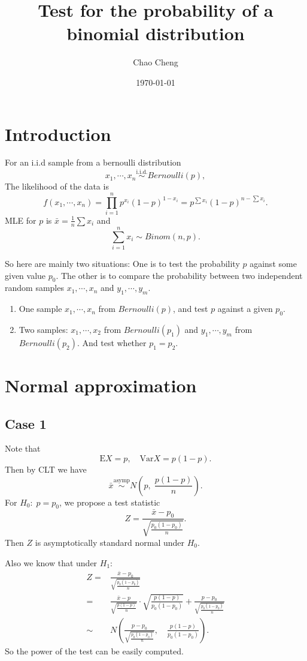 \documentclass[a4paper,12pt]{article}
\title{Test for the probability of a binomial distribution}
\author{Chao Cheng}
\date{\today}
\begin{document}
\maketitle

\tableofcontents{}

\section{Introduction}
\label{sec:introduction}


For an i.i.d sample from a bernoulli distribution
\[
  x_1, \cdots, x_n \overset{\mathrm{i.i.d.}}{\sim} Bernoulli(p)
  ,
\]
The likelihood of the data is
\[
  f\left(x_1, \cdots, x_n\right)
  = \prod\limits_{i = 1}^np^{x_i}\left(1 - p\right)^{1 - x_i}
  = p^{\sum x_i}\left(1 - p\right)^{n - \sum x_i}
  .
\]
MLE for $p$ is $\bar{x} = \frac{1}{n}\sum x_i$ and
\[
  \sum\limits_{i = 1}^nx_i \sim Binom(n, p)
  .
\]

So here are mainly two situations: One is to test the probability $p$ against some given value $p_0$. The other is to compare the probability between two independent random samples $x_1, \cdots, x_n$ and $y_1, \cdots, y_m$.
\begin{enumerate}[label = Case\arabic*:]
\item One sample $x_1, \cdots, x_n$ from $Bernoulli(p)$, and test $p$ against a given $p_0$.
\item Two samples: $x_1, \cdots, x_2$ from $Bernoulli(p_1)$ and $y_1, \cdots, y_m$ from $Bernoulli(p_2)$. And test whether $p_1 = p_2$.
\end{enumerate}

\section{Normal approximation}
\label{sec:normal-approximation}

\subsection{Case 1}
\label{sec:case-1}

Note that
\[
  \mathrm{E}X = p,\quad\mathrm{Var}X = p\left(1 - p\right).
\]
Then by CLT we have
\[
  \bar{x} \overset{\mathrm{asymp}}{\sim} N\left(p,\;\frac{p\left(1 - p\right)}{n}\right)
  .
\]
For $H_0:\;p = p_0$, we propose a test statistic
\[
  Z = \frac{\bar{x} - p_0}{\sqrt{\frac{p_0\left(1 - p_0\right)}{n}}}
  .
\]
Then $Z$ is asymptotically standard normal under $H_0$.
\par
Also we know that under $H_1$:
\[
  \begin{aligned}
    Z =& \frac{\bar{x} - p_0}{\sqrt{\frac{p_0\left(1 - p_0\right)}{n}}}    \\
    =& \frac{\bar{x} - p}{\sqrt{\frac{p\left(1 - p\right)}{n}}}
    \cdot \sqrt{\frac{p\left(1 - p\right)}{p_0\left(1 - p_0\right)}}
    + \frac{p - p_0}{\sqrt{\frac{p_0\left(1 - p_0\right)}{n}}}    \\
    \sim& N\left(
      \frac{p - p_0}{\sqrt{\frac{p_0\left(1 - p_0\right)}{n}}}
      ,\quad
      \frac{p\left(1 - p\right)}{p_0\left(1 - p_0\right)}
    \right)
    .
  \end{aligned}
\]
So the power of the test can be easily computed.
\end{document}
